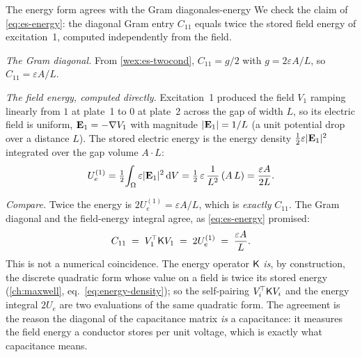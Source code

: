 \begin{workedexample}{The energy form agrees with the Gram diagonal}{es-energy}
We check the claim of \cref{eq:es-energy}: the diagonal Gram entry $C_{11}$ equals
twice the stored field energy of excitation~1, computed independently from the field.

\medskip
\emph{The Gram diagonal.} From \cref{wex:es-twocond}, $C_{11}=g/2$ with $g=2\varepsilon
A/L$, so $C_{11}=\varepsilon A/L$.

\emph{The field energy, computed directly.} Excitation~1 produced the field $V_1$
ramping linearly from $1$ at plate~1 to $0$ at plate~2 across the gap of width $L$,
so its electric field is uniform, $\mathbf{E}_1=-\nabla V_1$ with magnitude
$\lvert\mathbf{E}_1\rvert=1/L$ (a unit potential drop over a distance $L$). The stored electric
energy is the energy density $\tfrac12\varepsilon\lvert\mathbf{E}_1\rvert^2$ integrated over the
gap volume $A\cdot L$:
\[
  U_e^{(1)} = \tfrac12\!\int_\Omega \varepsilon\lvert\mathbf{E}_1\rvert^2\,\mathrm{d}V
            = \tfrac12\,\varepsilon\,\frac{1}{L^2}\,(A\,L)
            = \frac{\varepsilon A}{2L}.
\]

\emph{Compare.} Twice the energy is $2U_e^{(1)}=\varepsilon A/L$, which is
\emph{exactly} $C_{11}$. The Gram diagonal and the field-energy integral agree, as
\cref{eq:es-energy} promised:
\[
  C_{11} \;=\; V_1^{\!\top}\mathsf{K} V_1 \;=\; 2U_e^{(1)} \;=\; \frac{\varepsilon A}{L}.
\]
This is not a numerical coincidence. The energy operator $\mathsf{K}$ \emph{is}, by
construction, the discrete quadratic form whose value on a field is twice its stored
energy (\cref{ch:maxwell}, eq.~\eqref{eq:energy-density}); so the self-pairing
$V_i^{\!\top}\mathsf{K} V_i$ and the energy integral $2U_e$ are two evaluations of the same
quadratic form. The agreement is the reason the diagonal of the capacitance matrix
\emph{is} a capacitance: it measures the field energy a conductor stores per unit
voltage, which is exactly what capacitance means.
\end{workedexample}


